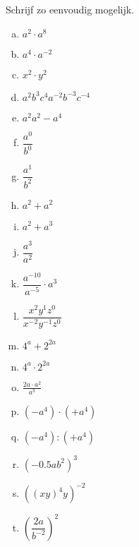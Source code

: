 \documentclass[12pt,twoside]{article}
\begin{document}
\begin{oefening}
Schrijf zo eenvoudig mogelijk.
\begin{multicols}{3}
\begin{enumerate}[(a)]
  \item $a^2\cdot a^8$
  \item $a^4\cdot a^{-2}$
  \item $x^2\cdot y^2$
  \item $a^2b^3c^4a^{-2}b^{-3}c^{-4}$
  \item $a^2a^2-a^4$
  \item $\dfrac{a^0}{b^0}$
  \item $\dfrac{a^1}{b^2}$
  \item $a^2+a^2$
  \item $a^2+a^3$
  \item $\dfrac{a^3}{a^2}$
  \item $\dfrac{a^{-10}}{a^{-5}}\cdot{a^3}$
  \item $\dfrac{x^2y^1z^0}{x^{-2}y^{-1}z^{0}}$
  \item $4^a+2^{2a}$
  \item $4^a\cdot2^{2a}$
  \item $\frac{2a\cdot a^{2}}{a^{3}}$
  \item $\left(-a^4\right)\cdot\left(+a^4\right)$
  \item $\left(-a^4\right):\left(+a^4\right)$
  \item $\left(-0.5ab^2\right)^3$
  \item $\left(\left(xy\right)^4y\right)^{-2}$
  \item $\left(\dfrac{2a}{b^{-2}}\right)^2$
\end{enumerate}
\end{multicols}
\end{oefening}
\end{document}
